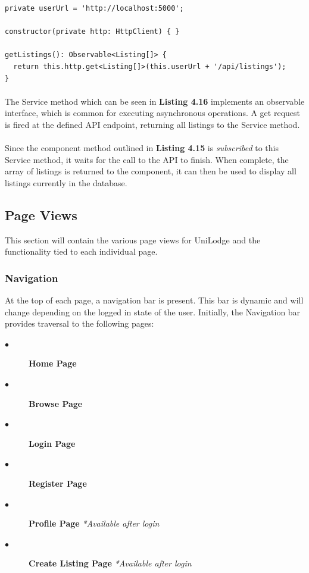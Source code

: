 \newpage

\begin{lstlisting}[caption=Service Method for Retrieving all Listings]
private userUrl = 'http://localhost:5000'; 

constructor(private http: HttpClient) { }

getListings(): Observable<Listing[]> {
  return this.http.get<Listing[]>(this.userUrl + '/api/listings');
}
\end{lstlisting}

\paragraph{}
The Service method which can be seen in \textbf{Listing 4.16} implements an observable interface, which is common for executing asynchronous operations. A get request is fired at the defined API endpoint, returning all listings to the Service method. 

\paragraph{}
Since the component method outlined in \textbf{Listing 4.15} is \textit{subscribed} to this Service method, it waits for the call to the API to finish. When complete, the array of listings is returned to the component, it can then be used to display all listings currently in the database.

\subsection{Page Views}
This section will contain the various page views for UniLodge and the functionality tied to each individual page.

\subsubsection{Navigation}
At the top of each page, a navigation bar is present. This bar is dynamic and will change depending on the logged in state of the user. Initially, the Navigation bar provides traversal to the following pages:

\begin{description}
  \item[$\bullet$] \textbf{Home Page}
  \item[$\bullet$] \textbf{Browse Page}
  \item[$\bullet$] \textbf{Login Page}
  \item[$\bullet$] \textbf{Register Page}
  \item[$\bullet$] \textbf{Profile Page} \textit{*Available after login}
  \item[$\bullet$] \textbf{Create Listing Page} \textit{*Available after login}
\end{description}

